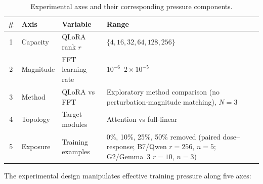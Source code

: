 \documentclass[a4paper,fleqn]{cas-dc}
\newif\ifshowchanges
\newcommand{\rev}[1]{\ifshowchanges{\color{blue}#1}\else{#1}\fi}
\begin{document}
\begin{table}[tp]
\caption{Experimental axes and their corresponding pressure
components.}\label{tab:axes}
\begin{tabular}{@{}cll>{\raggedright\arraybackslash}p{5.5cm}@{}}
\toprule
\# & Axis & Variable & Range \\
\midrule
1 & Capacity & QLoRA rank $r$ & $\{4, 16, 32, 64, 128, 256\}$ \\
2 & Magnitude & FFT learning rate & $10^{-6}$--$2{\times}10^{-5}$ \\
3 & Method & QLoRA vs FFT & \rev{Exploratory method comparison (no perturbation-magnitude matching)}, $N{=}3$ \\
4 & Topology & Target modules & Attention vs full-linear \\
5 & Exposure & Training examples & \rev{0\%, 10\%, 25\%, 50\% removed (paired dose--response; B7/Qwen $r{=}256$, $n{=}5$; G2/Gemma~3 $r{=}10$, $n{=}3$)} \\
\bottomrule
\end{tabular}
\end{table}

The experimental design manipulates effective training pressure along five axes:
\end{document}
